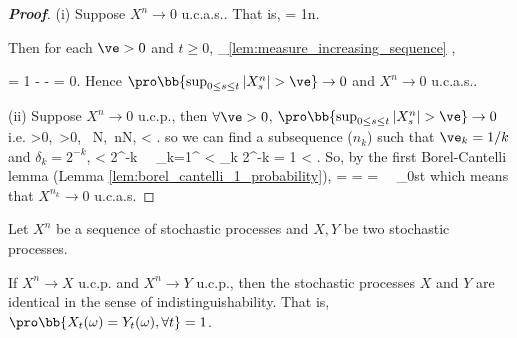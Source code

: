 \begin{proof}[\bf Proof]
\ben
\item [(i)] Suppose $X^n \to 0$ u.c.a.s.. That is,
\be
\pro{} = 1\quad {}n\to \infty.
\ee

Then for each $\ve > 0$ and $t\geq 0$,
\be
\pro{} \geq {}_{\ref{lem:measure_increasing_sequence}} \geq \pro{},
\ee

\be
\pro{} = 1 - \pro{}  - \pro{} = 0.
\ee
Hence $\pro\bb{\sup_{0\leq s\leq t}|X^n_s| > \ve} \to 0$ and $X^n \to 0$ u.c.a.s..

\item [(ii)] Suppose $X^n \to 0$ u.c.p., then $\forall \ve>0$, $\pro\bb{\sup_{0\leq s\leq t}|X^n_s| > \ve} \to 0$ i.e.
\be
\forall \ve>0,\ \delta >0, \ \exists N,\ \forall n\geq N,\quad \pro{} < \delta.
\ee
so we can find a subsequence ($n_k$) such that $\ve_k = 1/k$ and $\delta_k = 2^{-k}$,
\be
\pro{} < 2^{-k} \ \ra \ \sum_{k=1}^\infty \pro{} < \sum_k 2^{-k} = 1 < \infty.
\ee
So, by the first Borel-Cantelli lemma (Lemma \ref{lem:borel_cantelli_1_probability}),
 = \pro{} = \pro{} = \pro{} \ \ra\ \sup_{0\leq s\leq t} \nonumber
\ee
which means that $X^{n_k} \to 0$ u.c.a.s.
\een
\end{proof}



\begin{proposition}\label{pro:convergence_ucp_unique_in_sense_of_indistingushability}
Let $X^n$ be a sequence of stochastic processes and $X,Y$ be two stochastic processes.

If $X^n\to X$ u.c.p. and $X^n\to Y$ u.c.p., then the stochastic processes $X$ and $Y$ are identical in the sense of indistinguishability. That is, $\pro\bb{X_t(\omega) = Y_t(\omega), \forall t} = 1$.
\end{proposition}

